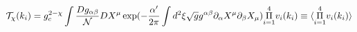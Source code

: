 \begin{equation}
\mathcal{T}_{\chi }(k_{i})=g_{c}^{2-\chi }\int \frac{Dg_{\alpha \beta }}{%
\mathcal{N}}DX^{\mu }\exp (-\frac{\alpha ^{\prime }}{2\pi }\int d^{2}\xi 
\sqrt{g}g^{\alpha \beta }\partial _{\alpha }X^{\mu }\partial _{\beta }X_{\mu
})\overset{4}{\underset{i=1}{\Pi }}v_{i}(k_{i})\equiv \langle \overset{4}{%
\underset{i=1}{\Pi }}v_{i}(k_{i})\rangle
\end{equation}%
